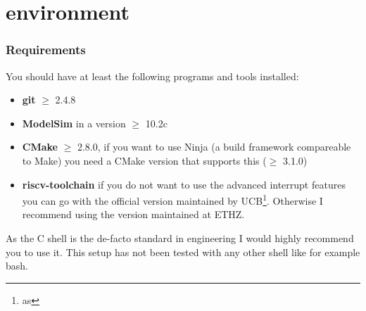
\chapter{\pulpino environment}

\subsection{Requirements}

You should have at least the following programs and tools installed:
\begin{itemize}
  \item \textbf{git} $\geq$ 2.4.8
  \item \textbf{ModelSim} in a version $\geq$ 10.2c
  \item \textbf{CMake} $\geq$ 2.8.0, if you want to use Ninja (a build framework compareable to Make) you need a CMake version that supports this ($\geq$ 3.1.0)
  \item \textbf{riscv-toolchain} if you do not want to use the advanced interrupt features you can go with the official version maintained by UCB\footnote{as}. Otherwise I recommend using the version maintained at ETHZ.
\end{itemize}
As the C shell is the de-facto standard in engineering I would highly recommend you to use it. This setup has not been tested with any other shell like for example bash.

